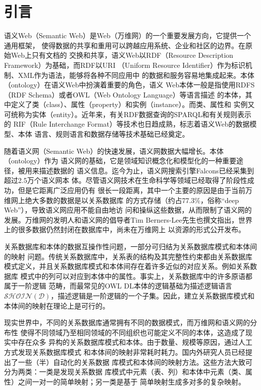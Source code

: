 \chapter{引言}
\label{chap00}
语义Web（Semantic Web）是Web（万维网）的一个重要发展方向，它提供一个通用框架，
使得数据的共享和重用可以跨越应用系统、企业和社区的边界。在原始Web上只有文档的
交换和共享，语义Web以RDF（Resource Description Framework）为基础，而RDF以URI
（Uniform Resource Identifier）作为标识机制、XML作为语法，能够将各种不同应用中
的数据和服务容易地集成起来。本体（ontology）在语义Web中扮演着重要的角色，语义
Web本体一般是指使用RDFS（RDF Schema）或者OWL（Web Ontology Language）等语言描述
的本体，其中定义了类（class）、属性（property）和实例（instance）。而类、属性和
实例又可统称为实体（entity）。近年来，有关RDF数据查询的SPARQL和有关规则表示的
RIF（Rule Interchange Format）等技术也日趋成熟，标志着语义Web的数据模型、本体
语言、规则语言和数据存储等技术基础已经奠定。

随着语义网（Semantic Web）的快速发展，语义网数据大幅增长。本体（ontology）作为
语义网的基础，它是领域知识概念化和模型化的一种重要途径，被用来描述数据的
语义信息。迄今为止，语义网搜索引擎Falcons\cite{1}已经采集到超过2.5万个语义网本
体。尽管语义网技术在生命科学等领域已经取得了阶段性成功，但是它距离广泛应用仍有
很长一段距离，其中一个主要的原因是由于当前万维网上绝大多数的数据是以关系数据库
的方式存储（约占77.3\%，俗称``deep Web''\cite{2}），导致语义网应用不能自由地访
问和操纵这些数据，从而限制了语义网的发展。万维网的发明人和语义网的倡导者Tim
Berners-Lee先生也撰文指出，世界上的很多数据仍然封闭在数据库中，尚未在万维网上
以资源的形式公开发布\cite{3}。

关系数据库和本体的数据互操作性问题，一部分可归结为关系数据库模式和本体间的映射
问题\cite{4}。传统关系数据库中，关系表的结构及其完整性约束都由关系数据库
模式定义，并且关系数据库模式和本体间存在着许多近似的对应关系。例如关系数据库
模式中的列可以对应到本体中的属性。事实上，关系数据库中的许多原语都属于一阶逻辑
范畴\cite{5}，而最常见的OWL DL本体\cite{6}的逻辑基础为描述逻辑语言
$\mathcal{SHOIN(D)}$，描述逻辑是一阶逻辑的一个子集。因此，建立关系数据库模式和
本体间的映射在理论上是可行的。

现实世界中，不同的关系数据库通常拥有不同的数据模式，而万维网和语义网的分布性
使得不同领域乃至相同领域的不同组织也可能定义不同的本体，这造成了现实中存在众多
异构的关系数据库模式和本体。由于数量、规模等原因，通过人工方式发现关系数据库模式
和本体间的映射非常耗时耗力。国内外研究人员已经提出了一些（半）自动化的关系数据
库模式和本体间的映射方法\cite{4,7}。这些方法大致可分为两类：一类是发现关系数据
库模式中元素（表、列）和本体中元素（类、属性）之间一对一的简单映射；另一类是基于
简单映射生成多对多的复杂映射。

